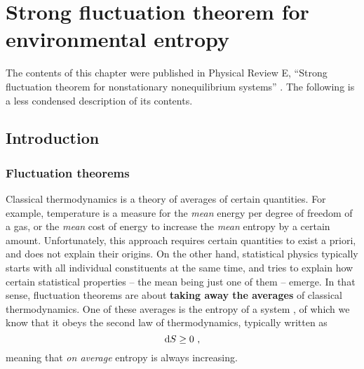 \chapter{Strong fluctuation theorem for environmental entropy}

The contents of this chapter were published in Physical Review E, ``Strong fluctuation theorem for nonstationary nonequilibrium systems'' \cite{bib:thingie-paper}. The following is a less condensed description of its contents.


\section{Introduction}



\subsection{Fluctuation theorems}

Classical thermodynamics is a theory of averages of certain quantities. For example, temperature is a measure for the \emph{mean} energy per degree of freedom of a gas, or the \emph{mean} cost of energy to increase the \emph{mean} entropy by a certain amount. Unfortunately, this approach requires certain quantities to exist a priori, and does not explain their origins. On the other hand, statistical physics typically starts with all individual constituents at the same time, and tries to explain how certain statistical properties -- the mean being just one of them -- emerge. In that sense, fluctuation theorems are about \textbf{taking away the averages} of classical thermodynamics. One of these averages is the entropy of a system , of which we know that it obeys the second law of thermodynamics, typically written as
%
\begin{equation}
	\label{eqn:2nd_law_classical}
	\mathrm{d} S \geq 0 ~,
\end{equation}
%
meaning that \emph{on average} entropy is always increasing.

